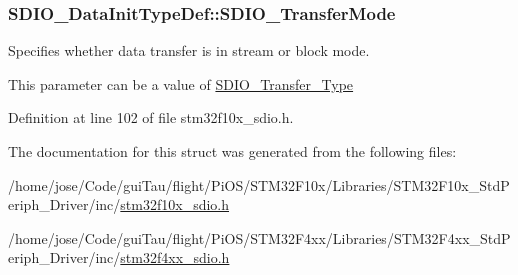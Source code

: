 \hypertarget{struct_s_d_i_o___data_init_type_def_a58ac19aaaceb2791d4bbcd30f334dd21}{
\subsubsection[{S\-D\-I\-O\-\_\-\-Transfer\-Mode}]{ S\-D\-I\-O\-\_\-\-Data\-Init\-Type\-Def\-::\-S\-D\-I\-O\-\_\-\-Transfer\-Mode}}\label{struct_s_d_i_o___data_init_type_def_a58ac19aaaceb2791d4bbcd30f334dd21}
\begin{DoxyVerb}   Specifies whether data transfer is in stream or block mode.
\end{DoxyVerb}
 This parameter can be a value of \hyperlink{group___s_d_i_o___transfer___type}{S\-D\-I\-O\-\_\-\-Transfer\-\_\-\-Type} 

Definition at line 102 of file stm32f10x\-\_\-sdio.\-h.



The documentation for this struct was generated from the following files\-:\begin{DoxyCompactItemize}
\item 
/home/jose/\-Code/gui\-Tau/flight/\-Pi\-O\-S/\-S\-T\-M32\-F10x/\-Libraries/\-S\-T\-M32\-F10x\-\_\-\-Std\-Periph\-\_\-\-Driver/inc/\hyperlink{stm32f10x__sdio_8h}{stm32f10x\-\_\-sdio.\-h}\item 
/home/jose/\-Code/gui\-Tau/flight/\-Pi\-O\-S/\-S\-T\-M32\-F4xx/\-Libraries/\-S\-T\-M32\-F4xx\-\_\-\-Std\-Periph\-\_\-\-Driver/inc/\hyperlink{stm32f4xx__sdio_8h}{stm32f4xx\-\_\-sdio.\-h}\end{DoxyCompactItemize}
